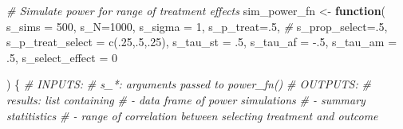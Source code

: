 \documentclass[
]{article}
\newenvironment{Shaded}{\begin{snugshade}}{\end{snugshade}}
\newcommand{\AttributeTok}[1]{\textcolor[rgb]{0.77,0.63,0.00}{#1}}
\newcommand{\CommentTok}[1]{\textcolor[rgb]{0.56,0.35,0.01}{\textit{#1}}}
\newcommand{\ControlFlowTok}[1]{\textcolor[rgb]{0.13,0.29,0.53}{\textbf{#1}}}
\newcommand{\DecValTok}[1]{\textcolor[rgb]{0.00,0.00,0.81}{#1}}
\newcommand{\FunctionTok}[1]{\textcolor[rgb]{0.00,0.00,0.00}{#1}}
\newcommand{\NormalTok}[1]{#1}
\newcommand{\OtherTok}[1]{\textcolor[rgb]{0.56,0.35,0.01}{#1}}
\newcommand{\SpecialCharTok}[1]{\textcolor[rgb]{0.00,0.00,0.00}{#1}}
\begin{document}
\begin{Shaded}
\begin{Highlighting}[]
\CommentTok{\# Simulate power for range of treatment effects}
\NormalTok{sim\_power\_fn }\OtherTok{\textless{}{-}} \ControlFlowTok{function}\NormalTok{(}
  \AttributeTok{s\_sims =} \DecValTok{500}\NormalTok{, }
  \AttributeTok{s\_N=}\DecValTok{1000}\NormalTok{, }
  \AttributeTok{s\_sigma =} \DecValTok{1}\NormalTok{, }
  \AttributeTok{s\_p\_treat=}\NormalTok{.}\DecValTok{5}\NormalTok{, }\CommentTok{\#}
  \AttributeTok{s\_prop\_select=}\NormalTok{.}\DecValTok{5}\NormalTok{, }
  \AttributeTok{s\_p\_treat\_select =} \FunctionTok{c}\NormalTok{(.}\DecValTok{25}\NormalTok{,.}\DecValTok{5}\NormalTok{,.}\DecValTok{25}\NormalTok{), }
  \AttributeTok{s\_tau\_st =}\NormalTok{ .}\DecValTok{5}\NormalTok{, }
  \AttributeTok{s\_tau\_af =} \SpecialCharTok{{-}}\NormalTok{.}\DecValTok{5}\NormalTok{, }
  \AttributeTok{s\_tau\_am =}\NormalTok{ .}\DecValTok{5}\NormalTok{, }
  \AttributeTok{s\_select\_effect =} \DecValTok{0}
  
  
  
\NormalTok{) \{}
  \CommentTok{\# INPUTS:}
    \CommentTok{\# s\_*: arguments passed to power\_fn()}
  \CommentTok{\# OUTPUTS:}
  \CommentTok{\# results: list containing }
  \CommentTok{\#           {-} data frame of  power simulations}
  \CommentTok{\#           {-} summary statitistics}
  \CommentTok{\#           {-} range of correlation between selecting treatment and outcome}
  

\end{Highlighting}
\end{Shaded}
\end{document}
